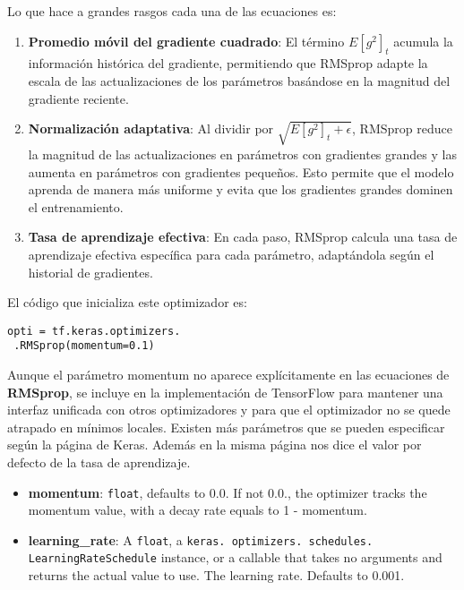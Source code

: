 \documentclass[../main.tex]{subfiles}
\begin{document}
\begin{itemize}
\begin{enumerate}
  \end{enumerate}
  
  Lo que hace a grandes rasgos cada una de las ecuaciones es:
  
  \begin{enumerate}
  \item \textbf{Promedio móvil del gradiente cuadrado}:  
     El término \( E[g^2]_t \) acumula la información histórica del gradiente, permitiendo que RMSprop adapte la escala de las actualizaciones de los parámetros basándose en la magnitud del gradiente reciente.
  
  \item \textbf{Normalización adaptativa}:  
     Al dividir por \( \sqrt{E[g^2]_t + \epsilon} \), RMSprop reduce la magnitud de las actualizaciones en parámetros con gradientes grandes y las aumenta en parámetros con gradientes pequeños. Esto permite que el modelo aprenda de manera más uniforme y evita que los gradientes grandes dominen el entrenamiento.
  
  \item \textbf{Tasa de aprendizaje efectiva}:  
     En cada paso, RMSprop calcula una tasa de aprendizaje efectiva específica para cada parámetro, adaptándola según el historial de gradientes.
  \end{enumerate}

  El código que inicializa este optimizador es:

  \begin{verbatim}
opti = tf.keras.optimizers.
 .RMSprop(momentum=0.1) 
  \end{verbatim}

  Aunque el parámetro momentum no aparece explícitamente en las ecuaciones de \textbf{RMSprop}, se incluye en la implementación de TensorFlow para mantener una interfaz unificada con otros optimizadores y para que el optimizador no se quede atrapado en mínimos locales. Existen más parámetros que se pueden especificar según la página de Keras. Además en la misma página nos dice el valor por defecto de la tasa de aprendizaje.

  
  \begin{displayquote}
    \begin{itemize}
      \item \textbf{momentum}: \texttt{float}, defaults to 0.0. If not 0.0., the optimizer tracks the momentum value, with a decay rate equals to 1 - momentum.
      \item \textbf{learning\_rate}:
      A \texttt{float}, a \texttt{keras. optimizers. schedules. LearningRateSchedule} instance, or a callable that takes no arguments and returns the actual value to use. The learning rate. Defaults to 0.001. \cite{keras_rmsprop}
    \end{itemize}
  \end{displayquote}


\end{itemize}
\end{document}
